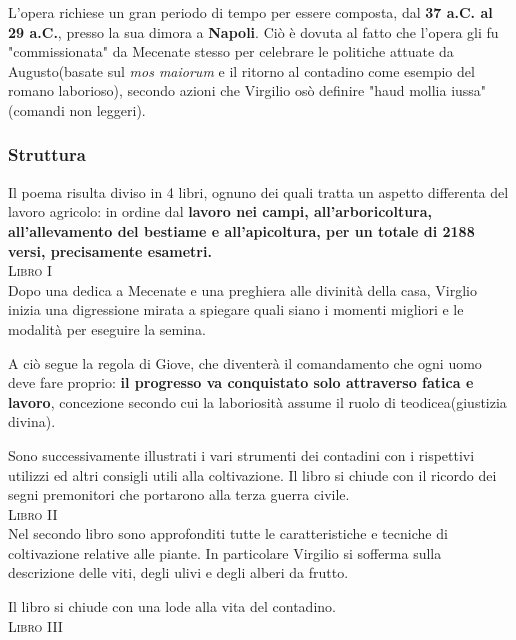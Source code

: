 \documentclass[10pt,a4paper]{article}
\begin{document}
	L'opera richiese un gran periodo di tempo per essere composta, dal \textbf{37 a.C. al 29 a.C.}, presso la sua dimora a \textbf{Napoli}. Ciò è dovuta al fatto che l'opera gli fu "commissionata" da Mecenate stesso per celebrare le politiche attuate da Augusto(basate sul \textit{mos maiorum} e il ritorno al contadino come esempio del romano laborioso), secondo azioni che Virgilio osò definire "haud mollia iussa"(comandi non leggeri). 
	
	\subsubsection*{Struttura}
	
	Il poema risulta diviso in 4 libri, ognuno dei quali tratta un aspetto differenta del lavoro agricolo: in ordine dal \textbf{lavoro nei campi, all'arboricoltura, all'allevamento del bestiame e all'apicoltura, per un totale di 2188 versi, precisamente esametri.}\\
	
	\textsc{Libro I}\\
	
	Dopo una dedica a Mecenate e una preghiera alle divinità della casa, Virglio inizia una digressione mirata a spiegare quali siano i momenti migliori e le modalità per eseguire la semina.
	
	A ciò segue la regola di Giove, che diventerà il comandamento che ogni uomo deve fare proprio: \textbf{il progresso va conquistato solo attraverso fatica e lavoro}, concezione secondo cui la laboriosità assume il ruolo di teodicea(giustizia divina).
	
	Sono successivamente illustrati i vari strumenti dei contadini con i rispettivi utilizzi ed altri consigli utili alla coltivazione. Il libro si chiude con il ricordo dei segni premonitori che portarono alla terza guerra civile.\\
	
	\textsc{Libro II}\\
	
	Nel secondo libro sono approfonditi tutte le caratteristiche e tecniche di coltivazione relative alle piante. In particolare Virgilio si sofferma sulla descrizione delle viti, degli ulivi e degli alberi da frutto. 
	
	Il libro si chiude con una lode alla vita del contadino.\\
	
	\textsc{Libro III}\\
	
\end{document}
